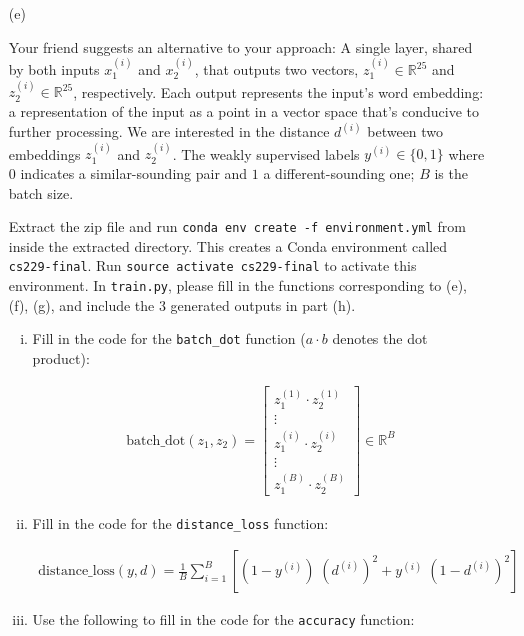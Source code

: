 \documentclass{article}
\begin{document}
\begin{itemize}

    \item [(e)] 

Your friend suggests an alternative to your approach: A single layer, shared by both inputs $x_1^{(i)}$ and $x_2^{(i)}$, that outputs two vectors, $z_1^{(i)} \in \mathbb{R}^{25}$ and $z_2^{(i)} \in \mathbb{R}^{25}$, respectively. Each output represents the input's word embedding: a representation of the input as a point in a vector space that's conducive to further processing. We are interested in the distance $d^{(i)}$ between two embeddings $z_1^{(i)}$ and $z_2^{(i)}$. The weakly supervised labels $y^{(i)} \in \{0, 1\}$ where $0$ indicates a similar-sounding pair and $1$ a different-sounding one; $B$ is the batch size. 

Extract the zip file and run \texttt{conda env create -f environment.yml} from inside the extracted directory. This creates a Conda environment called \texttt{cs229-final}. Run \texttt{source activate cs229-final} to activate this environment. In \texttt{train.py}, please fill in the functions corresponding to (e), (f), (g), and include the 3 generated outputs in part (h). 
    
    \begin{enumerate}[(i)]
    \item Fill in the code for the \texttt{batch\_dot} function ($a \cdot b$ denotes the dot product):
    
    \begin{align}
    \mathrm{batch\_dot}(z_1, z_2) = \begin{bmatrix}
        z_1^{(1)} \cdot z_2^{(1)} \\
        \vdots \\
        z_1^{(i)} \cdot z_2^{(i)} \\
        \vdots \\
        z_1^{(B)} \cdot z_2^{(B)}
    \end{bmatrix} \in \mathbb{R}^{B}
    \end{align}
    \item Fill in the code for the \texttt{distance\_loss} function:
    
    \begin{align}
    \mathrm{distance\_loss}(y, d) = \frac{1}{B} \sum_{i = 1}^{B} \left[ (1 - y^{(i)}) \; (d^{(i)})^2 + y^{(i)} \; (1 - d^{(i)})^2 \right]
    \end{align}
    \item Use the following to fill in the code for the \texttt{accuracy} function:
    

\end{enumerate}
\end{itemize}
\end{document}
